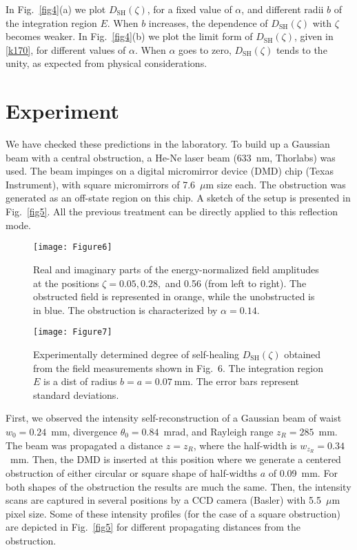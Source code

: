 \documentclass[10pt]{article}
\newcommand{\sugg}[1]{{#1}}
\begin{document}
In Fig.~\ref{fig4}(a) we plot $ D_{\mathrm{SH}} (\zeta)$, for a fixed value
of $\alpha$, and different radii $b$ of the integration region
$E$. When $b$ increases, the dependence of $ D_{\mathrm{SH}} (\zeta)$ with
$\zeta$ becomes weaker.  In Fig.~\ref{fig4}(b) we plot the limit form
of $ D_{\mathrm{SH}} (\zeta)$, given in \eqref{k170}, for different values
of $\alpha$. When $\alpha$ goes to zero, $ D_{\mathrm{SH}} (\zeta)$ tends
to the unity, as expected from physical considerations.

\section{Experiment}


We have checked these predictions in the laboratory. To build up a
Gaussian beam with a central obstruction, a He-Ne laser beam (633~nm,
Thorlabs) was used. The beam impinges on a digital micromirror device
(DMD) chip (Texas Instrument),  with square micromirrors of
7.6~$\mu$m size each.  The obstruction  was generated as an off-state
region on this chip. A sketch of the setup is presented in
Fig.~\ref{fig5}.  All the previous treatment can be directly applied 
to this reflection mode.

\begin{figure}[t]
  \centerline{\texttt{[image: Figure6]}}
  \caption{Real and imaginary parts of the energy-normalized field
    amplitudes at the     positions $\zeta = 0.05, 0.28,$ and 0.56
    (from left to right). The   obstructed field is represented in
    orange, while the unobstructed  is in blue. The obstruction is
    characterized by $\alpha = 0.14$.} 
  \label{fig6}
\end{figure}
\begin{figure}[b]
  \centerline{\texttt{[image: Figure7]}}
  \caption{Experimentally determined degree of self-healing
    $D_{\mathrm{SH}} ( \zeta)$ obtained from the field measurements
    shown in Fig.~6. The integration region $E$ is a dist of radius
    $b=a=0.07~\text{mm}$. The error bars represent standard deviations.}
  \label{fig7}
\end{figure}

First, we observed the intensity self-reconstruction of a Gaussian
beam of waist $w_{0} = 0.24$~mm, divergence $\theta_{0} = 0.84$~mrad,
and Rayleigh range $z_{R} = 285$~mm.  The beam was propagated a
distance $z = z_{R}$, where the half-width is $w_{z_{R}} =
0.34$~mm. Then, \sugg{the DMD is inserted at this position where we generate
a centered obstruction of either circular or square shape of
half-widths $a$ of 0.09~mm.} For both shapes of the obstruction the
results are much the same.  Then, the intensity scans are captured in
several positions by a CCD camera (Basler) with 5.5~$\mu$m pixel size.
Some of these intensity profiles (for the case of a square
obstruction) are depicted in Fig.~\ref{fig5} for different propagating
distances from the obstruction.
\end{document}
